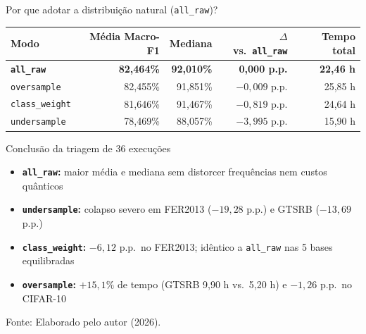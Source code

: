 \documentclass[aspectratio=169,11pt,brazil]{beamer}
\newcommand{\fonte}[1]{\par\vfill{\footnotesize\color{textmuted}Fonte: #1\par}}
\newcommand{\destaque}[1]{\textcolor{senacorange}{\textbf{#1}}}
\begin{document}
\begin{frame}{Por que adotar a distribuição natural (\texttt{all\_raw})?}
  \centering
  {\footnotesize
  \begin{tabular}{@{}lrrrr@{}}
    \toprule
    \textbf{Modo} & \textbf{Média Macro-F1} & \textbf{Mediana} & \textbf{$\Delta$ vs.\ \texttt{all\_raw}} & \textbf{Tempo total} \\
    \midrule
    \textbf{\texttt{all\_raw}} & \textbf{82,464\%} & \textbf{92,010\%} & \textbf{0,000 p.p.} & \textbf{22,46 h} \\
    \texttt{oversample} & 82,455\% & 91,851\% & $-0{,}009$ p.p. & 25,85 h \\
    \texttt{class\_weight} & 81,646\% & 91,467\% & $-0{,}819$ p.p. & 24,64 h \\
    \texttt{undersample} & 78,469\% & 88,057\% & $-3{,}995$ p.p. & 15,90 h \\
    \bottomrule
  \end{tabular}}
  \vspace{0.18cm}
  \begin{block}{Conclusão da triagem de 36 execuções}
    \begin{itemize}\setlength{\itemsep}{2pt}
      \item \textcolor{okgreen}{\textbf{\texttt{all\_raw}:}} maior média e mediana sem distorcer frequências nem custos quânticos
      \item \textcolor{badred}{\textbf{\texttt{undersample}:}} colapso severo em FER2013 ($-19{,}28$ p.p.) e GTSRB ($-13{,}69$ p.p.)
      \item \textcolor{badred}{\textbf{\texttt{class\_weight}:}} $-6{,}12$ p.p.\ no FER2013; idêntico a \texttt{all\_raw} nas 5 bases equilibradas
      \item \destaque{\texttt{oversample}:} $+15{,}1\%$ de tempo (GTSRB 9,90 h vs.\ 5,20 h) e $-1{,}26$ p.p.\ no CIFAR-10
    \end{itemize}
  \end{block}
  \fonte{Elaborado pelo autor (2026).}
\end{frame}
\end{document}
